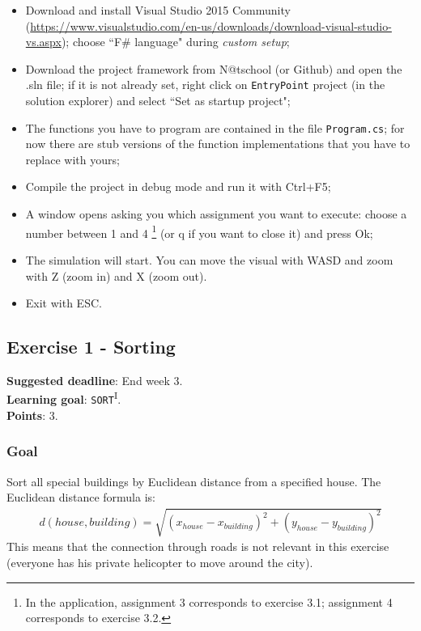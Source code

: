 \begin{itemize}
\item Download and install Visual Studio 2015 Community (\url{https://www.visualstudio.com/en-us/downloads/download-visual-studio-vs.aspx}); choose ``F\# language" during \textit{custom setup}; 
\item Download the project framework from N@tschool (or Github) and open the .sln file; if it is not already set, right click on \texttt{EntryPoint} project (in the solution explorer) and select ``Set as startup project";
\item The functions you have to program are contained in the file \texttt{Program.cs}; for now there are stub versions of the function implementations that you have to replace with yours;
\item Compile the project in debug mode and run it with Ctrl+F5;
\item A window opens asking you which assignment you want to execute: choose a number between 1 and 4 \footnote{In the application, assignment 3 corresponds to exercise 3.1; assignment 4 corresponds to exercise 3.2.} (or q if you want to close it) and press Ok;
\item The simulation will start. You can move the visual with WASD and zoom with Z (zoom in) and X (zoom out).
\item Exit with ESC. 
\end{itemize}

\newpage
\subsection*{Exercise 1 - Sorting}

\textbf{Suggested deadline}: End week 3. \\
\textbf{Learning goal}: \texttt{SORT}\textsuperscript{I}. \\
\textbf{Points}: 3.

\subsubsection*{Goal}
Sort all special buildings by Euclidean distance from a specified house. The Euclidean distance formula is:
\begin{align*}
d(house,building) = \sqrt{(x_{house} - x_{building})^{2} + (y_{house} - y_{building})^{2} } 
\end{align*}
This means that the connection through roads is not relevant in this exercise (everyone has his private helicopter to move around the city).

